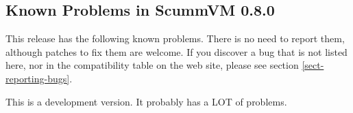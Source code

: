 

\subsection{Known Problems in ScummVM 0.8.0}

This release has the following known problems. There is no need to report them,
although patches to fix them are welcome. If you discover a bug that is not
listed here, nor in the compatibility table on the web site, please see
section \ref{sect-reporting-bugs}.

This is a development version. It probably has a LOT of problems. 
